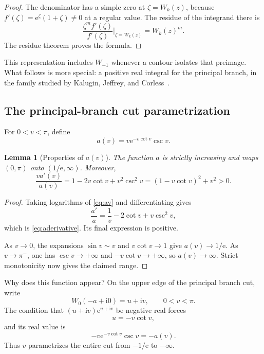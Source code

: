 \documentclass[11pt]{article}
\newtheorem{lemma}[lemma]{Lemma}
\theoremstyle{remark}
\newcommand{\ee}{\mathrm e}
\newcommand{\ii}{\mathrm i}
\begin{document}
\begin{proof}
The denominator has a simple zero at \(\zeta=W_k(z)\), because
\(f'(\zeta)=\ee^\zeta(1+\zeta)\neq0\) at a regular value.  The residue of the
integrand there is
\[
 \frac{\zeta^m f'(\zeta)}{f'(\zeta)}
 \bigg|_{\zeta=W_k(z)}
 =W_k(z)^m.
\]
The residue theorem proves the formula.
\end{proof}

This representation includes \(W_{-1}\) whenever a contour isolates that
preimage.  What follows is more special: a positive real integral for the principal
branch, in the family studied by Kalugin, Jeffrey, and
Corless~\cite{kalugin2012}.

\subsection{The principal-branch cut parametrization}

For \(0<v<\pi\), define
\begin{equation}\label{eq:av}
       a(v)=v\ee^{-v\cot v}\csc v.
\end{equation}

\begin{lemma}[Properties of \(a(v)\)]\label{lem:av}
The function \(a\) is strictly increasing and maps \((0,\pi)\) onto
\((1/\ee,\infty)\).  Moreover,
\begin{equation}\label{eq:aderivative}
 \frac{v a'(v)}{a(v)}
 =1-2v\cot v+v^2\csc^2v
 =(1-v\cot v)^2+v^2>0.
\end{equation}
\end{lemma}

\begin{proof}
Taking logarithms of \eqref{eq:av} and differentiating gives
\[
 \frac{a'}a=\frac1v-2\cot v+v\csc^2v,
\]
which is \eqref{eq:aderivative}.  Its final expression is positive.

As \(v\to0\), the expansions
\(\sin v\sim v\) and \(v\cot v\to1\) give \(a(v)\to1/\ee\).
As \(v\to\pi^-\), one has \(\csc v\to+\infty\) and
\(-v\cot v\to+\infty\), so \(a(v)\to\infty\).  Strict monotonicity now gives
the claimed range.
\end{proof}

Why does this function appear?  On the upper edge of the principal branch
cut, write
\[
       W_0(-a+\ii0)=u+\ii v,\qquad 0<v<\pi.
\]
The condition that \((u+\ii v)\ee^{u+\ii v}\) be negative real forces
\[
       u=-v\cot v,
\]
and its real value is
\[
       -v\ee^{-v\cot v}\csc v=-a(v).
\]
Thus \(v\) parametrizes the entire cut from \(-1/\ee\) to \(-\infty\).
\end{document}
